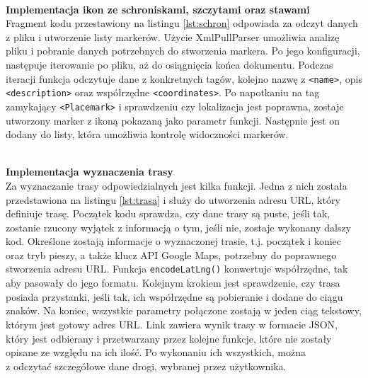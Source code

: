 \\

\noindent
\textbf{Implementacja ikon ze schroniskami, szczytami oraz stawami} \\ 
\indent Fragment kodu przestawiony na listingu \ref{lst:schron} odpowiada za odczyt danych z pliku i utworzenie listy markerów. Użycie XmlPullParser umożliwia analizę pliku i pobranie danych potrzebnych do stworzenia markera. Po jego konfiguracji, następuje iterowanie po pliku, aż do osiągnięcia końca dokumentu. Podczas iteracji funkcja odczytuje dane z konkretnych tagów, kolejno nazwę z \verb|<name>|, opis \verb|<description>| oraz współrzędne \verb|<coordinates>|. Po napotkaniu na tag zamykający \verb|<Placemark>| i sprawdzeniu czy lokalizacja jest poprawna, zostaje utworzony marker z ikoną pokazaną jako parametr funkcji. Następnie jest on dodany do listy, która umożliwia kontrolę widoczności markerów. \\

\noindent
\begin{minipage}{\linewidth}
    \label{lst:schron}
    \centering
\end{minipage}\\


\textbf{Implementacja wyznaczenia trasy}\\
\indent Za wyznaczanie trasy odpowiedzialnych jest kilka funkcji. Jedna z nich została przedstawiona na listingu \ref{lst:trasa} i służy do utworzenia adresu URL, który definiuje trasę. Początek kodu sprawdza, czy dane trasy są puste, jeśli tak, zostanie rzucony wyjątek z informacją o tym, jeśli nie, zostaje wykonany dalszy kod. Określone zostają informacje o wyznaczonej trasie, t.j. początek i koniec oraz tryb pieszy, a także klucz API Google Maps, potrzebny do poprawnego stworzenia adresu URL. Funkcja \verb|encodeLatLng()| konwertuje współrzędne, tak aby pasowały do jego formatu. Kolejnym krokiem jest sprawdzenie, czy trasa posiada przystanki, jeśli tak, ich współrzędne są pobieranie i dodane do ciągu znaków. Na koniec, wszystkie parametry połączone zostają w jeden ciąg tekstowy, którym jest gotowy adres URL. Link zawiera wynik trasy w formacie JSON, który jest odbierany i przetwarzany przez kolejne funkcje, które nie zostały opisane ze względu na ich ilość. Po wykonaniu ich wszystkich, można \\z odczytać szczegółowe dane drogi, wybranej przez użytkownika. \\


